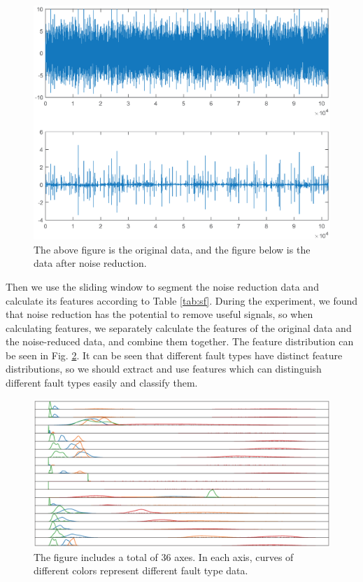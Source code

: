 \documentclass{modified}
\begin{document}
\begin{figure}[htbp]
	\centering
	\includegraphics[width=\columnwidth]{pre.eps}
	\caption{The above figure is the original data, and the figure below is the data after noise reduction.}
	\label{fig:pre}
\end{figure}

Then we use the sliding window to segment the noise reduction data and calculate its features according to Table \ref{tab:sf}. During the experiment, we found that noise reduction has the potential to remove useful signals, so when calculating features, we separately calculate the features of the original data and the noise-reduced data, and combine them together. The feature distribution can be seen in Fig. \ref{fig:feature}. It can be seen that different fault types have distinct feature distributions, so we should extract and use features which can distinguish different fault types easily and classify them.

\begin{figure}[htbp]
	\centering
	\includegraphics[width=\columnwidth]{feature.eps}
	\caption{The figure includes a total of 36 axes. In each axis, curves of different colors represent different fault type data.}
	\label{fig:feature}
\end{figure}
\end{document}
